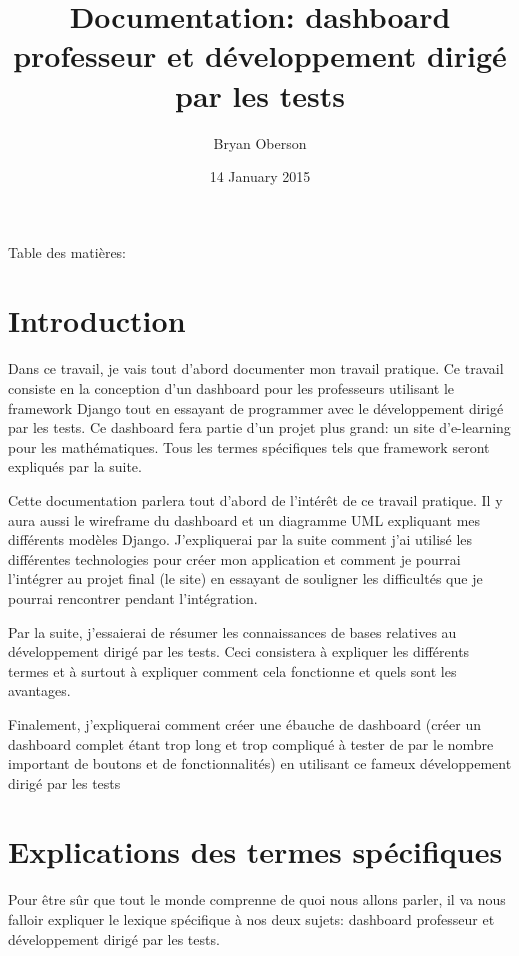 \documentclass[letterpaper,10pt,french]{sphinxmanual}
\title{Documentation: dashboard professeur et développement dirigé par les tests}
\date{14 January 2015}
\author{Bryan Oberson}
\begin{document}
\maketitle
\tableofcontents
{}\label{index::doc}
Table des matières:




\chapter{Introduction}
\label{introduction:introduction}\label{introduction:conception-du-dashboard-professeur-a-laide-du-developpement-dirige-par-les-tests}\label{introduction::doc}
Dans ce travail, je vais tout d'abord documenter mon travail pratique. Ce
travail consiste en la conception d'un dashboard pour les professeurs
utilisant le framework Django tout en essayant de programmer
avec le développement dirigé par les tests.
Ce dashboard fera partie d'un projet plus grand: un site d'e-learning pour les
mathématiques.
Tous les termes spécifiques tels que framework seront expliqués par la suite.

Cette documentation parlera tout d'abord de l'intérêt de ce travail pratique.
Il y aura aussi le wireframe du dashboard et un diagramme UML expliquant mes
différents modèles Django. J'expliquerai par la suite comment j'ai utilisé
les différentes technologies pour créer mon application et comment
je pourrai l'intégrer au projet final (le site) en essayant de souligner les
difficultés que je pourrai rencontrer pendant l'intégration.

Par la suite, j'essaierai de résumer les connaissances de bases relatives
au développement dirigé par les tests. Ceci consistera à expliquer les
différents termes et à surtout à expliquer comment cela fonctionne et quels
sont les avantages.

Finalement, j'expliquerai comment créer une ébauche de dashboard (créer un
dashboard complet étant trop long et trop compliqué à tester de par le nombre
important de boutons et de fonctionnalités) en utilisant ce fameux
développement dirigé par les tests


\chapter{Explications des termes spécifiques}
\label{introduction:explications-des-termes-specifiques}
Pour être sûr que tout le monde comprenne de quoi nous allons parler,
il va nous falloir expliquer le lexique spécifique à nos deux sujets:
dashboard professeur et développement dirigé par les tests.
\end{document}
